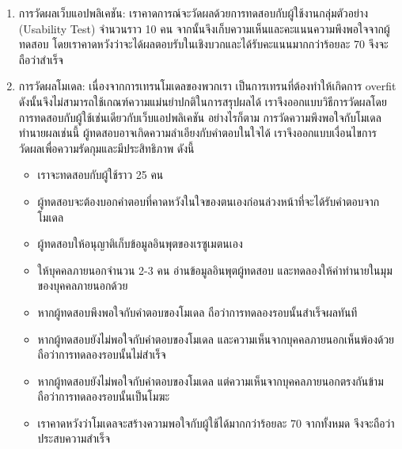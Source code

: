 \begin{enumerate}
    \item การวัดผลเว็บแอปพลิเคชัน: เราคาดการณ์จะวัดผลด้วยการทดสอบกับผู้ใช้งานกลุ่มตัวอย่าง (Usability Test) จำนวนราว 10 คน จากนั้นจึงเก็บความเห็นและคะแนนความพึงพอใจจากผู้ทดสอบ
    โดยเราคาดหวังว่าจะได้ผลตอบรับในเชิงบวกและได้รับคะแนนมากกว่าร้อยละ 70 จึงจะถือว่าสำเร็จ
    \item การวัดผลโมเดล: เนื่องจากการเทรนโมเดลของพวกเรา เป็นการเทรนที่ต้องทำให้เกิดการ overfit ดังนั้นจึงไม่สามารถใช้เกณฑ์ความแม่นยำปกติในการสรุปผลได้ 
    เราจึงออกแบบวิธีการวัดผลโดยการทดสอบกับผู้ใช้เช่นเดียวกับเว็บแอปพลิเคชัน อย่างไรก็ตาม การวัดความพึงพอใจกับโมเดลทำนายผลเช่นนี้ 
    ผู้ทดสอบอาจเกิดความลำเอียงกับคำตอบในใจได้ เราจึงออกแบบเงื่อนไขการวัดผลเพื่อความรัดกุมและมีประสิทธิภาพ ดังนี้
    \begin{itemize}
        \item เราจะทดสอบกับผู้ใช้ราว 25 คน
        \item ผู้ทดสอบจะต้องบอกคำตอบที่คาดหวังในใจของตนเองก่อนล่วงหน้าที่จะได้รับคำตอบจากโมเดล
        \item ผู้ทดสอบให้อนุญาติเก็บข้อมูลอินพุตของเรซูเมตนเอง
        \item ให้บุคคลภายนอกจำนวน 2-3 คน อ่านข้อมูลอินพุตผู้ทดสอบ และทดลองให้คำทำนายในมุมของบุคคลภายนอกด้วย
        \item หากผู้ทดสอบพึงพอใจกับคำตอบของโมเดล ถือว่าการทดลองรอบนั้นสำเร็จผลทันที
        \item หากผู้ทดสอบยังไม่พอใจกับคำตอบของโมเดล และความเห็นจากบุคคลภายนอกเห็นพ้องด้วย ถือว่าการทดลองรอบนั้นไม่สำเร็จ
        \item หากผู้ทดสอบยังไม่พอใจกับคำตอบของโมเดล แต่ความเห็นจากบุคคลภายนอกตรงกันข้าม ถือว่าการทดลองรอบนั้นเป็นโมฆะ
        \item เราคาดหวังว่าโมเดลจะสร้างความพอใจกับผู้ใช้ได้มากกว่าร้อยละ 70 จากทั้งหมด จึงจะถือว่าประสบความสำเร็จ
    \end{itemize}
\end{enumerate}




